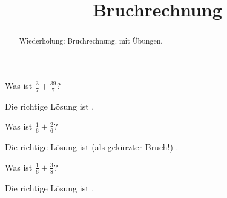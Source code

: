 \documentclass{ximera}
\title{Bruchrechnung}
\begin{document}
\begin{abstract}
Wiederholung: Bruchrechnung, mit Übungen.
\end{abstract}
\maketitle

\begin{question}
Was ist $\frac 37 + \frac{39}{7}$?
\begin{solution}
Die richtige Lösung ist
.
\end{solution}
\end{question}

\begin{question}
Was ist $\frac{1}{6} + \frac{2}{6}$?
\begin{solution}
Die richtige Lösung ist (als gekürzter Bruch!)
.
\end{solution}
\end{question}

\begin{question}
Was ist $\frac{1}{6} + \frac{3}{8}$?
\begin{solution}
Die richtige Lösung ist
.
\end{solution}
\end{question}
\end{document}
